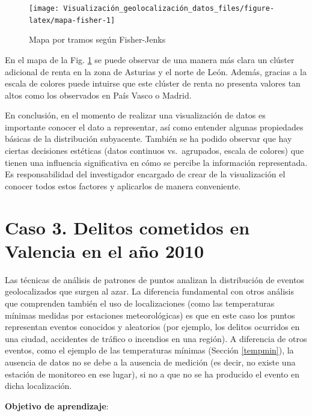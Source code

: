 \documentclass[
]{book}
\theoremstyle{definition}
\theoremstyle{definition}
\theoremstyle{definition}
\theoremstyle{definition}
\theoremstyle{remark}
\begin{document}
\begin{figure}

{\centering \texttt{[image: Visualización\_geolocalización\_datos\_files/figure-latex/mapa-fisher-1]} 

}

\caption{Mapa por tramos según Fisher-Jenks}\label{fig:mapa-fisher}
\end{figure}

En el mapa de la Fig. \ref{fig:mapa-fisher} se puede observar de una manera más
clara un clúster adicional de renta en la zona de Asturias y el norte de León.
Además, gracias a la escala de colores puede intuirse que este clúster de renta
no presenta valores tan altos como los observados en País Vasco o Madrid.

En conclusión, en el momento de realizar una visualización de datos es
importante conocer el dato a representar, así como entender algunas propiedades
básicas de la distribución subyacente. También se ha podido observar que hay
ciertas decisiones estéticas (datos continuos vs.~agrupados, escala de colores)
que tienen una influencia significativa en cómo se percibe la información
representada. Es responsabilidad del investigador encargado de crear de la
visualización el conocer todos estos factores y aplicarlos de manera
conveniente.

\hypertarget{caso-3.-delitos-cometidos-en-valencia-en-el-auxf1o-2010}{%
\section{Caso 3. Delitos cometidos en Valencia en el año 2010}\label{caso-3.-delitos-cometidos-en-valencia-en-el-auxf1o-2010}}

Las técnicas de análisis de patrones de puntos analizan la distribución de
eventos geolocalizados que surgen al azar. La diferencia fundamental con otros
análisis que comprenden también el uso de localizaciones (como las temperaturas
mínimas medidas por estaciones meteorológicas) es que en este caso los puntos
representan eventos conocidos y aleatorios (por ejemplo, los delitos ocurridos
en una ciudad, accidentes de tráfico o incendios en una región). A diferencia de
otros eventos, como el ejemplo de las temperaturas mínimas (Sección
\ref{tempmin}), la ausencia de datos no se debe a la ausencia de medición (es
decir, no existe una estación de monitoreo en ese lugar), si no a que no se ha
producido el evento en dicha localización.

\textbf{Objetivo de aprendizaje}:
\end{document}
